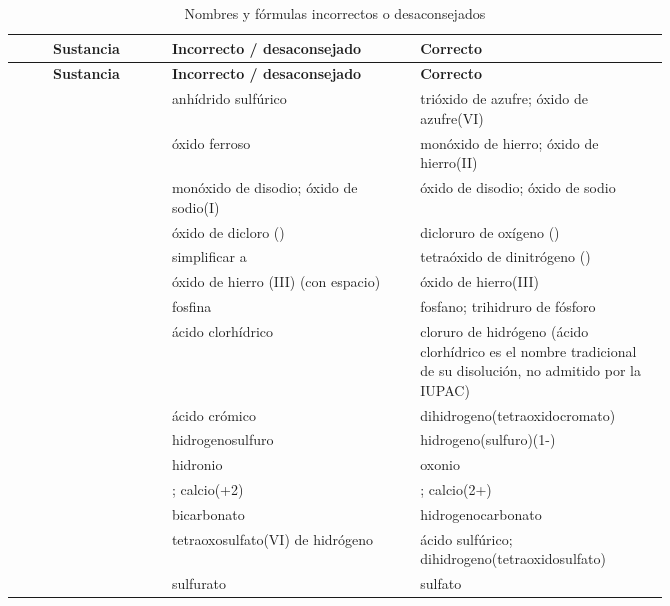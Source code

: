 \documentclass[12pt]{article}
\theoremstyle{mygreennumbox}
\begin{document}
\begin{center}
    \begin{longtable}{@{}c L{0.38\linewidth} L{0.38\linewidth}@{}}
        \caption{Nombres y fórmulas incorrectos o desaconsejados} \\
        \toprule
        \textbf{Sustancia} & \textbf{Incorrecto / desaconsejado} & \textbf{Correcto} \\
        \midrule
        \endfirsthead
        \toprule
        \textbf{Sustancia} & \textbf{Incorrecto / desaconsejado} & \textbf{Correcto} \\
        \midrule
        \endhead
        \bottomrule
        \endlastfoot
         & anhídrido sulfúrico & trióxido de azufre; óxido de azufre(VI) \\[3pt]
         & óxido ferroso & monóxido de hierro; óxido de hierro(II) \\[3pt]
         & monóxido de disodio; óxido de sodio(I) & óxido de disodio; óxido de sodio \\[3pt]
         & óxido de dicloro () & dicloruro de oxígeno () \\[3pt]
         & simplificar a  & tetraóxido de dinitrógeno () \\[3pt]
         & óxido de hierro (III) (con espacio) & óxido de hierro(III) \\[3pt]
         & fosfina & fosfano; trihidruro de fósforo \\[3pt]
         & ácido clorhídrico & cloruro de hidrógeno (ácido clorhídrico es el nombre tradicional de su disolución, no admitido por la IUPAC) \\[3pt]
         & ácido crómico & dihidrogeno(tetraoxidocromato) \\[3pt]
         & hidrogenosulfuro & hidrogeno(sulfuro)(1-) \\[3pt]
         & hidronio & oxonio \\[3pt]
         & ; calcio(+2) & ; calcio(2+) \\[3pt]
         & bicarbonato & hidrogenocarbonato \\[3pt]
         & tetraoxosulfato(VI) de hidrógeno & ácido sulfúrico; dihidrogeno(tetraoxidosulfato) \\[3pt]
         & sulfurato & sulfato \\
    \end{longtable}
\end{center}
\end{document}
